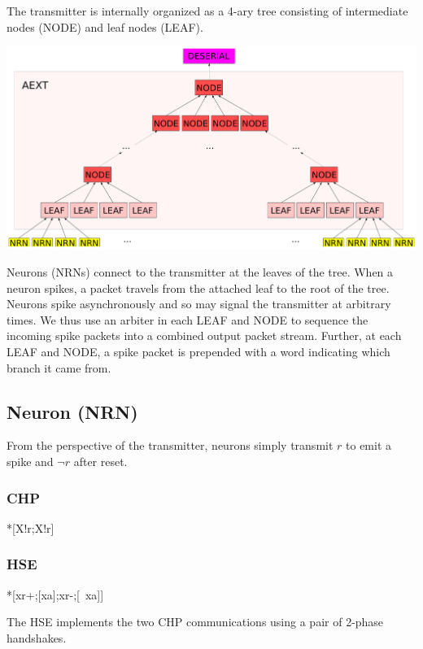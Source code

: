 \documentclass{article}
\begin{document}
The transmitter is internally organized as a 4-ary tree consisting of intermediate
nodes (NODE) and leaf nodes (LEAF).
\begin{center}
    \includegraphics[width=.7\textwidth]{img/aext.pdf}
\end{center}
Neurons (NRNs) connect to the transmitter at the leaves of the tree.
When a neuron spikes, a packet travels from the attached leaf to the root of 
the tree. Neurons spike asynchronously and so may signal the transmitter at 
arbitrary times. We thus use an arbiter in each LEAF and NODE to sequence the 
incoming spike packets into a combined output packet stream. Further, at each 
LEAF and NODE, a spike packet is prepended with a word indicating which 
branch it came from.

\subsection{Neuron (NRN) \label{sec:AEXT_NRN}}

From the perspective of the transmitter, neurons simply transmit $r$ to 
emit a spike and $\neg r$ after reset.

\subsubsection*{CHP}

\begin{csp}
*[X!r;X!\neg r]
\end{csp}

\subsubsection*{HSE}

\begin{hse}
*[xr+;[xa];xr-;[~xa]]
\end{hse}

\noindent
The HSE implements the two CHP communications using a pair of 2-phase handshakes.
\end{document}
